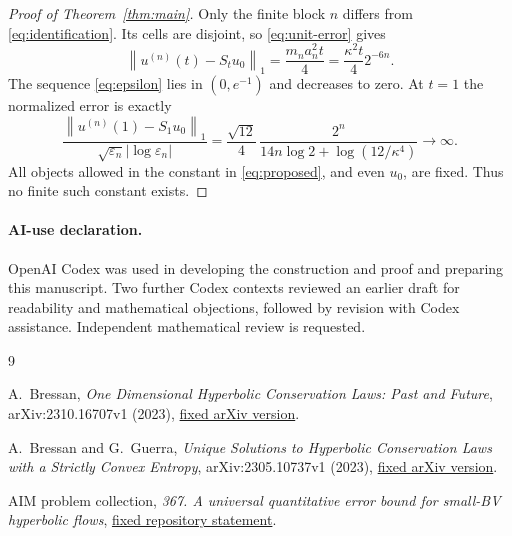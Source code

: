 \documentclass[11pt]{article}
\newcommand{\norm}[1]{\left\|#1\right\|}
\begin{document}
\begin{proof}[Proof of Theorem~\ref{thm:main}]
Only the finite block $n$ differs from \eqref{eq:identification}. Its cells are disjoint, so \eqref{eq:unit-error} gives
\[
 \norm{u^{(n)}(t)-S_tu_0}_1
 =\frac{m_na_n^2t}{4}
 =\frac{\kappa^2t}{4}2^{-6n}.
\]
The sequence \eqref{eq:epsilon} lies in $(0,e^{-1})$ and decreases to zero. At $t=1$ the normalized error is exactly
\begin{equation}\label{eq:divergence}
 \frac{\norm{u^{(n)}(1)-S_1u_0}_1}
      {\sqrt{\varepsilon_n}|\log\varepsilon_n|}
 =\frac{\sqrt{12}}4\,
   \frac{2^n}{14n\log2+\log(12/\kappa^4)}\longrightarrow\infty.
\end{equation}
All objects allowed in the constant in \eqref{eq:proposed}, and even $u_0$, are fixed. Thus no finite such constant exists.
\end{proof}

\paragraph{AI-use declaration.}
OpenAI Codex was used in developing the construction and proof and preparing this manuscript. Two further Codex contexts reviewed an earlier draft for readability and mathematical objections, followed by revision with Codex assistance. Independent mathematical review is requested.

\begin{thebibliography}{9}
\raggedright
{}
A.~Bressan,
\emph{One Dimensional Hyperbolic Conservation Laws: Past and Future},
arXiv:2310.16707v1 (2023),
\href{https://arxiv.org/abs/2310.16707v1}{fixed arXiv version}.

A.~Bressan and G.~Guerra,
\emph{Unique Solutions to Hyperbolic Conservation Laws with a Strictly Convex Entropy},
arXiv:2305.10737v1 (2023),
\href{https://arxiv.org/abs/2305.10737v1}{fixed arXiv version}.

AIM problem collection,
\emph{367. A universal quantitative error bound for small-BV hyperbolic flows},
\href{https://github.com/MColbrook/AIM/blob/a153f469ee0ea64e876b2ad97c79d252c19a3e22/problems/367-universal-hyperbolic-error-rate.md}{fixed repository statement}.
\end{thebibliography}
\end{document}
